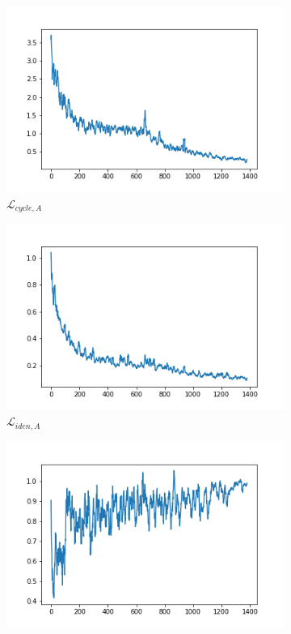 \documentclass{beamer}
\begin{document}
\begin{frame}
\begin{figure}[htb]
\begin{subfigure}[b]{0.23\linewidth}
            \includegraphics[width=\linewidth]{exp2_cycle_A.png}
            \caption{$\mathcal{L}_{cycle,A}$}
          \end{subfigure}
          \begin{subfigure}[b]{0.23\linewidth}
            \includegraphics[width=\linewidth]{exp2_idt_A.png}
            \caption{$\mathcal{L}_{iden,A}$}
          \end{subfigure}
          \begin{subfigure}[b]{0.23\linewidth}
            \includegraphics[width=\linewidth]{exp2_G_B.png}

\end{subfigure}
\end{figure}
\end{frame}
\end{document}
